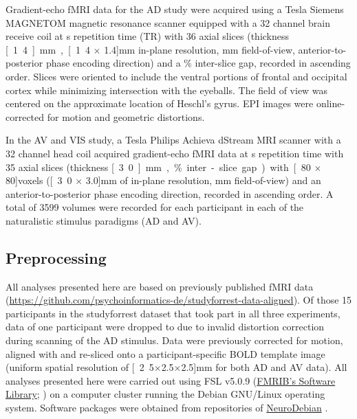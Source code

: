 \documentclass[english]{article}
\begin{document}
Gradient-echo fMRI data for the AD study were acquired using a \unit[7]{Tesla}
Siemens MAGNETOM magnetic resonance scanner equipped with a 32 channel brain
receive coil at \unit[2]{s} repetition time (TR) with 36 axial slices (thickness
\unit[1.4]{mm}, \unit[1.4 $\times$ 1.4]{mm} in-plane resolution, \unit[224]{mm}
field-of-view, anterior-to-posterior phase encoding direction) and a
\unit[10]{\%} inter-slice gap, recorded in ascending order.
Slices were oriented to include the ventral portions of frontal and occipital
cortex while minimizing intersection with the eyeballs.
The field of view was centered on the approximate location of Heschl's gyrus.
EPI images were online-corrected for motion and geometric distortions.

In the AV and VIS study, a \unit[3]{Tesla} Philips Achieva dStream
MRI scanner with a 32 channel head coil acquired gradient-echo fMRI data
at \unit[2]{s} repetition time with
35 axial slices (thickness \unit[3.0]{mm}, \unit[10]{\%} inter-slice gap) with
\unit[80 $\times$ 80]{voxels} (\unit[3.0 $\times$ 3.0]{mm} of in-plane
resolution, \unit[240]{mm} field-of-view) and an anterior-to-posterior phase
encoding direction, recorded in ascending order.
A total of 3599 volumes were recorded for each participant in each of the
naturalistic stimulus paradigms (AD and AV).

\subsection{Preprocessing}

All analyses presented here are based on previously published fMRI data
(\url{https://github.com/psychoinformatics-de/studyforrest-data-aligned}).
Of those 15 participants in the studyforrest dataset that took
part in all three experiments,
data of one participant were dropped to due to invalid distortion correction
during scanning of the AD stimulus.
Data were previously corrected for motion, aligned with and re-sliced onto a
participant-specific BOLD template image \citep{sengupta2016extension}
(uniform spatial resolution of \unit[2.5$\times$2.5$\times$2.5]{mm} for both
AD and AV data).
All analyses presented here were carried out using
FSL v5.0.9 (\href{https://www.fmrib.ox.ac.uk/fsl}{FMRIB's Software Library};
\citep{smith2004fsl}) on a computer cluster running the Debian GNU/Linux
operating system. Software packages were obtained from repositories of
\href{http://neuro.debian.net}{NeuroDebian} \citep{halchenko2012open}.
\end{document}
